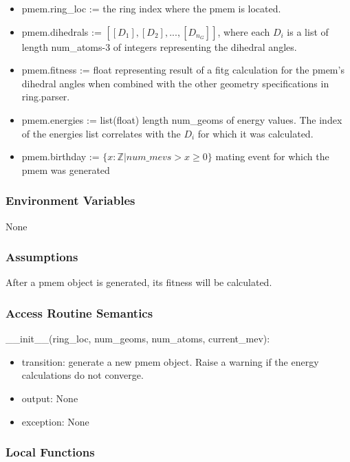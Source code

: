 \documentclass[12pt, titlepage]{article}
\begin{document}
\begin{itemize}
	\item pmem.ring\_loc := the ring index where the pmem is located.
	\item pmem.dihedrals := $[[D_1], [D_2], ..., [D_{n_G}]]$, where each $D_i$ 
	is a list of length num\_atoms-3 of 
	integers representing the dihedral angles.
	\item pmem.fitness := float representing result of a fitg calculation for 
	the pmem's dihedral angles when combined with the other geometry 
	specifications in ring.parser.
	\item pmem.energies := list(float) length num\_geoms of energy values. The 
	index of the energies list correlates with the $D_i$ for which it was 
	calculated.
	\item pmem.birthday := $\{x:\mathbb{Z} | num\_mevs > x \geq 0\}$ mating 
	event 
	for which the pmem was generated
\end{itemize}

\subsubsection{Environment Variables}

None

\subsubsection{Assumptions}

After a pmem object is generated, its fitness will be calculated.

\subsubsection{Access Routine Semantics}

\noindent \_\_init\_\_(ring\_loc, num\_geoms, num\_atoms, current\_mev):
\begin{itemize}
	\item transition: generate a new pmem object. Raise a warning if the energy 
	calculations do not converge.
	\item output: None
	\item exception: None
\end{itemize}

\subsubsection{Local Functions}
\end{document}
